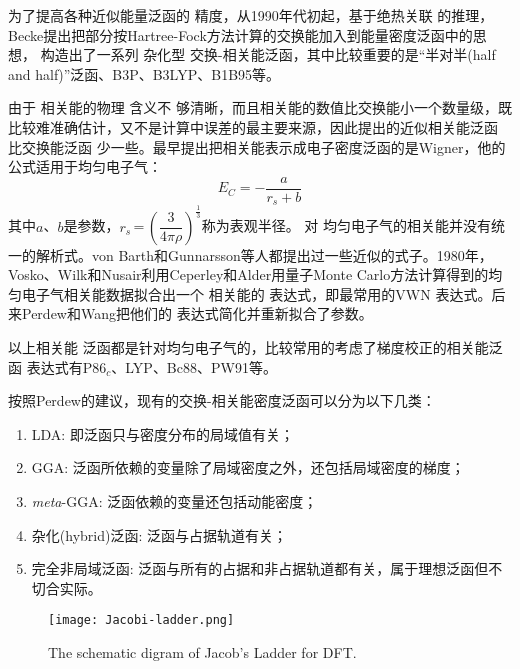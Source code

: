为了提高各种近似{能量}泛函的%
精度，从1990年代初起，基于绝热关联%
{的推理}，Becke提出把部分按Hartree-Fock方法计算的交换能加入到能量密度泛函中的思想{，}%
构造出了一系列%
杂化型%
交换-相关{能}泛函，其中比较重要的是“半对半(half and half)”泛函\cite{JCP98-1372_1993}、B3P\cite{JCP98-5648_1993}、B3LYP\cite{JPC98-11623_1994}、B1B95\cite{JCP104-1040_1995}等。

由于%
相关能的物理%
{含}义不%
{够}清晰，而且相关能的数值比交换能小一个数量级，既比较难准确估计，又不是计算中误差的最主要来源，因此提出的{近似}相关能泛函%
比交换能泛函%
少一些。最早提出把相关能表示成电子密度泛函的是Wigner\cite{PR46-1002_1934}，他的公式适用于均匀电子气：
\begin{equation}
  E_C=-\dfrac a{r_s+b}
  \label{eq:dft-16}
\end{equation}
其中$a$、$b$是参数，$r_s$\,=\,$\left(\dfrac3{4\pi\rho}\right)^{\frac13}$称为表观半径。%
对%
均匀电子气的相关能并没有统一\linebreak 的解析式。von Barth\cite{JPC5-1629_1972}和Gunnarsson\cite{PRB13-4274_1976}等人都提出过一些近似的式子。1980年，\linebreak Vosko、Wilk和Nusair\cite{CJP58-1200_1980}利用Ceperley和Alder\cite{PRL45-566_1980}用量子Monte Carlo方法计算得到的{均匀电子气}相关能数据拟合出一个%
相关能的%
{表达}式，即最常用的VWN%
{表达}式。后来Perdew和Wang\cite{PRB45-13244_1992}把他们的%
{表达}式简化并重新拟合了参数。

以上相关能%
{泛函}都是针对均匀电子气的，比较常用的考虑了梯度校正的相关能泛函%
{表达}式有P86$_c$\cite{PRB33-8822_1986}、LYP\cite{PRB37-785_1988}、Bc88\cite{JCP88-1053_1988}、PW91\cite{PRB46-6671_1992,PRB48-4978_1993,PRB54-16533_1996,PRB57-14999_1998}等。

按照Perdew的建议\cite{Perdew-Schmidt_2001}，现有的交换-相关能密度泛函可以分为以下几类：
\begin{enumerate}
  \item LDA: 即泛函只与密度分布的局域值有关；
  \item GGA: 泛函所依赖的变量除了局域密度之外，还包括局域密度的梯度；
  \item \textit{meta}-GGA: 泛函依赖的变量还包括动能密度；
  \item {杂化(hybrid)泛函}: 泛函与占据轨道有关；
  \item 完全非局域泛函: 泛函与所有的占据和非占据轨道都有关，属于理想泛函但不%
{切合实际}。
\end{enumerate}
\begin{figure}[!h]
\centering
\texttt{[image: Jacobi-ladder.png]}
\caption{\small The schematic digram of Jacob's Ladder for DFT.\cite{Perdew-Schmidt_2001,Science298-759_2002}}
\label{Fig:Jacob-Ladder}
\end{figure}

